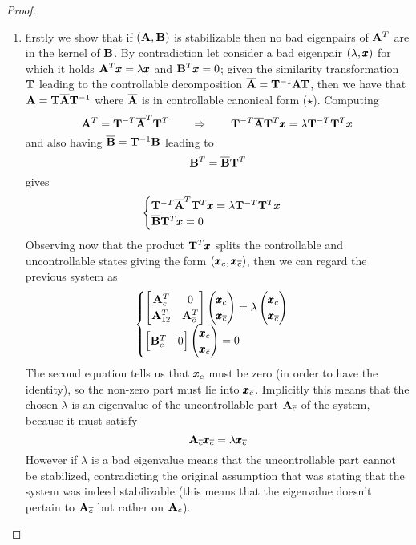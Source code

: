 	\begin{proof}
	\begin{enumerate}[\itshape a)]
		\item firstly we show that if $(\mathbf{A},\mathbf{B})$ is stabilizable then no bad eigenpairs of $\mathbf{A}^T$ are in the kernel of $\mathbf{B}$. By contradiction let consider a bad eigenpair $(\lambda,\pmb{x})$ for which it holds $\mathbf{A}^T\pmb{x} = \lambda \pmb{x}$ and $\mathbf{B}^T\pmb{x}= 0$; given the similarity transformation $\mathbf{T}$ leading to the controllable decomposition $\overline {\mathbf{A}} = \mathbf{T}^{-1}\mathbf{A}\mathbf{T}$, then we have that $\mathbf{A} = \mathbf{T} \overline {\mathbf{A}} \mathbf{T}^{-1}$ where $\overline {\mathbf{A}}$ is in controllable canonical form ($\star$). Computing
		\[ \mathbf{A}^T = \mathbf{T}^{-T} \overline {\mathbf{A}}^T \mathbf{T}^T \qquad \Rightarrow \qquad \mathbf{T}^{-T}\overline {\mathbf{A}} \mathbf{T}^T\pmb{x} = \lambda \mathbf{T}^{-T} \mathbf{T}^T \pmb{x} \]
		and also having $\overline {\mathbf{B}} = \mathbf{T}^{-1}\mathbf{B}$ leading to
		\[ \mathbf{B}^T = \overline {\mathbf{B}} \mathbf{T}^T \]
		gives
		\[ \begin{cases}
			\mathbf{T}^{-T}\overline {\mathbf{A}}^T \mathbf{T}^T\pmb{x} = \lambda \mathbf{T}^{-T} \mathbf{T}^T \pmb{x} \\ \overline {\mathbf{B}} \mathbf{T}^T \pmb{x} = 0
		\end{cases} \]
		Observing now that the product $\mathbf{T}^T\pmb{x}$ splits the controllable and uncontrollable states giving the form $(\pmb{x}_c, \pmb{x}_{\overline c})$, then we can regard the previous system as
		\[ \begin{cases}
			\begin{bmatrix} \mathbf{A}_c^T & 0 \\ \mathbf{A}_{12}^T & \mathbf{A}_{\overline c}^T \end{bmatrix} \begin{pmatrix} \pmb{x}_c \\ \pmb{x}_{\overline c} \end{pmatrix} = \lambda \begin{pmatrix} \pmb{x}_c \\ \pmb{x}_{\overline c} \end{pmatrix} \\
			\begin{bmatrix} \mathbf{B}_c^T & 0  \end{bmatrix} \begin{pmatrix} \pmb{x}_c \\ \pmb{x}_{\overline c} \end{pmatrix} = 0
		\end{cases} \]
		The second equation tells us that $\pmb{x}_c$ must be zero (in order to have the identity), so the non-zero part must lie into $\pmb{x}_{\overline c}$. Implicitly this means that the chosen $\lambda$ is an eigenvalue of the uncontrollable part $\mathbf{A}_{\overline c}$ of the system, because it must satisfy
		\[ \mathbf{A}_{\overline c}\pmb{x}_{\overline c} = \lambda \pmb{x}_{\overline c} \]
		However if $\lambda$ is a bad eigenvalue means that the uncontrollable part cannot be stabilized, contradicting the original assumption that was stating that the system was indeed stabilizable (this means that the eigenvalue doesn't pertain to $\mathbf{A}_{\overline c}$ but rather on $\mathbf{A}_c$).
			

\end{enumerate}
\end{proof}
